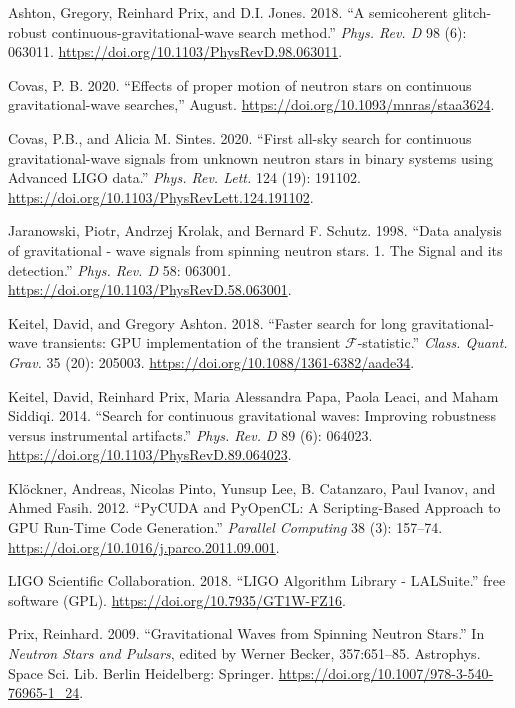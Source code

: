 \documentclass[10pt,a4paper,onecolumn]{article}
\begin{document}
\leavevmode\hypertarget{ref-Ashton:2018qth}{}%
Ashton, Gregory, Reinhard Prix, and D.I. Jones. 2018. ``A semicoherent
glitch-robust continuous-gravitational-wave search method.'' \emph{Phys.
Rev. D} 98 (6): 063011.
\url{https://doi.org/10.1103/PhysRevD.98.063011}.

\leavevmode\hypertarget{ref-Covas:2020hcy}{}%
Covas, P. B. 2020. ``Effects of proper motion of neutron stars on
continuous gravitational-wave searches,'' August.
\url{https://doi.org/10.1093/mnras/staa3624}.

\leavevmode\hypertarget{ref-Covas:2020nwy}{}%
Covas, P.B., and Alicia M. Sintes. 2020. ``First all-sky search for
continuous gravitational-wave signals from unknown neutron stars in
binary systems using Advanced LIGO data.'' \emph{Phys. Rev. Lett.} 124
(19): 191102. \url{https://doi.org/10.1103/PhysRevLett.124.191102}.

\leavevmode\hypertarget{ref-Jaranowski:1998qm}{}%
Jaranowski, Piotr, Andrzej Krolak, and Bernard F. Schutz. 1998. ``Data
analysis of gravitational - wave signals from spinning neutron stars. 1.
The Signal and its detection.'' \emph{Phys. Rev. D} 58: 063001.
\url{https://doi.org/10.1103/PhysRevD.58.063001}.

\leavevmode\hypertarget{ref-Keitel:2018pxz}{}%
Keitel, David, and Gregory Ashton. 2018. ``Faster search for long
gravitational-wave transients: GPU implementation of the transient
\(\mathcal F\)-statistic.'' \emph{Class. Quant. Grav.} 35 (20): 205003.
\url{https://doi.org/10.1088/1361-6382/aade34}.

\leavevmode\hypertarget{ref-Keitel:2013wga}{}%
Keitel, David, Reinhard Prix, Maria Alessandra Papa, Paola Leaci, and
Maham Siddiqi. 2014. ``Search for continuous gravitational waves:
Improving robustness versus instrumental artifacts.'' \emph{Phys. Rev.
D} 89 (6): 064023. \url{https://doi.org/10.1103/PhysRevD.89.064023}.

\leavevmode\hypertarget{ref-Kloeckner:2012pyc}{}%
Klöckner, Andreas, Nicolas Pinto, Yunsup Lee, B. Catanzaro, Paul Ivanov,
and Ahmed Fasih. 2012. ``PyCUDA and PyOpenCL: A Scripting-Based Approach
to GPU Run-Time Code Generation.'' \emph{Parallel Computing} 38 (3):
157--74. \url{https://doi.org/10.1016/j.parco.2011.09.001}.

\leavevmode\hypertarget{ref-lalsuite}{}%
LIGO Scientific Collaboration. 2018. ``LIGO Algorithm Library -
LALSuite.'' free software (GPL).
\url{https://doi.org/10.7935/GT1W-FZ16}.

\leavevmode\hypertarget{ref-Prix:2009oha}{}%
Prix, Reinhard. 2009. ``Gravitational Waves from Spinning Neutron
Stars.'' In \emph{Neutron Stars and Pulsars}, edited by Werner Becker,
357:651--85. Astrophys. Space Sci. Lib. Berlin Heidelberg: Springer.
\url{https://doi.org/10.1007/978-3-540-76965-1_24}.
\end{document}
